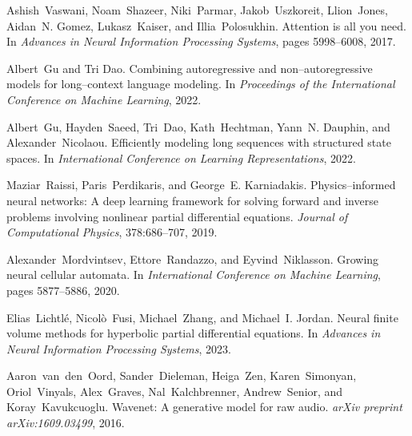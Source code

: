 \documentclass[10pt]{article}
\begin{document}

\begin{thebibliography}{99}
Ashish~Vaswani, Noam~Shazeer, Niki~Parmar, Jakob~Uszkoreit, Llion~Jones,
  Aidan~N. Gomez, Lukasz~Kaiser, and Illia~Polosukhin.
\newblock Attention is all you need.
\newblock In \emph{Advances in Neural Information Processing Systems}, pages
  5998--6008, 2017.

Albert~Gu and Tri Dao.
\newblock Combining autoregressive and non--autoregressive models for
  long--context language modeling.
\newblock In \emph{Proceedings of the International Conference on Machine
  Learning}, 2022.

Albert~Gu, Hayden~Saeed, Tri~Dao, Kath~Hechtman, Yann~N. Dauphin, and
  Alexander~Nicolaou.
\newblock Efficiently modeling long sequences with structured state spaces.
\newblock In \emph{International Conference on Learning Representations}, 2022.

Maziar~Raissi, Paris~Perdikaris, and George~E. Karniadakis.
\newblock Physics--informed neural networks: A deep learning framework for
  solving forward and inverse problems involving nonlinear partial differential
  equations.
\newblock \emph{Journal of Computational Physics}, 378:686--707, 2019.

Alexander~Mordvintsev, Ettore~Randazzo, and Eyvind~Niklasson.
\newblock Growing neural cellular automata.
\newblock In \emph{International Conference on Machine Learning}, pages
  5877--5886, 2020.

Elias~Lichtlé, Nicolò~Fusi, Michael~Zhang, and Michael~I. Jordan.
\newblock Neural finite volume methods for hyperbolic partial differential
  equations.
\newblock In \emph{Advances in Neural Information Processing Systems}, 2023.

Aaron~van~den~Oord, Sander~Dieleman, Heiga~Zen, Karen~Simonyan, Oriol~Vinyals,
  Alex~Graves, Nal~Kalchbrenner, Andrew~Senior, and Koray~Kavukcuoglu.
\newblock Wavenet: A generative model for raw audio.
\newblock \emph{arXiv preprint arXiv:1609.03499}, 2016.

\end{thebibliography}
\end{document}

